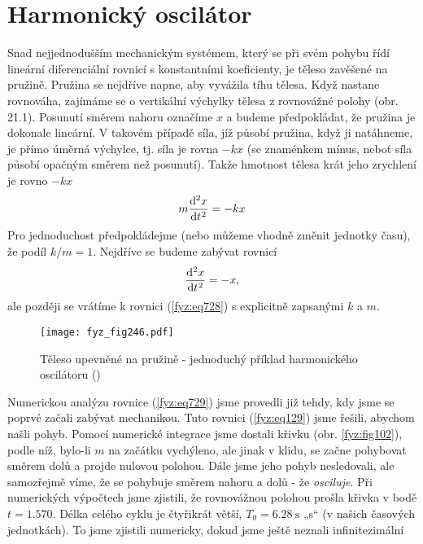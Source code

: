   \section{Harmonický oscilátor}\label{fyz:IchapXXIsecII}
    Snad nejjednodušším mechanickým systémem, který se při svém pohybu řídí lineární diferenciální
    rovnicí s konstantními koeficienty, je těleso zavěšené na pružině. Pružina se nejdříve napne,
    aby vyvážila tíhu tělesa. Když nastane rovnováha, zajímáme se o vertikální výchylky tělesa z
    rovnovážné polohy (obr. 21.1). Posunutí směrem nahoru označíme \(x\) a budeme předpokládat, že
    pružina je dokonale lineární. V takovém případě síla, jíž působí pružina, když ji natáhneme, je
    přímo úměrná výchylce, tj. síla je rovna \(-kx\) (se znaménkem mínus, neboť síla působí opačným
    směrem než posunutí). Takže hmotnost tělesa krát jeho zrychlení je rovno \(-kx\)
    \begin{equation}\label{fyz:eq728}
      m\diff[2]xt = -kx
    \end{equation}
    Pro jednoduchost předpokládejme (nebo můžeme vhodně změnit jednotky času), že podíl
    \(k/m =1\). Nejdříve se budeme zabývat rovnicí
    \begin{equation}\label{fyz:eq729}
      \diff[2]xt = -x,
    \end{equation}
    ale později se vrátíme k rovnici (\ref{fyz:eq728}) s explicitně zapsanými \(k\) a \(m\).
    \begin{figure}[ht!] %
      \centering
      \texttt{[image: fyz\_fig246.pdf]}
      \caption{Těleso upevněné na pružině - jednoduchý příklad harmonického oscilátoru
               (\cite[s.~287]{Feynman01})}
      \label{fyz:fig246}
    \end{figure}
    Numerickou analýzu rovnice (\ref{fyz:eq729}) jsme provedli již tehdy, kdy jsme se poprvé začali
    zabývat mechanikou. Tuto rovnici (\ref{fyz:eq129}) jsme řešili, abychom našli pohyb. Pomocí
    numerické integrace jsme dostali křivku (obr. \ref{fyz:fig102}), podle níž, bylo-li \(m\) na
    začátku vychýleno, ale jinak v klidu, se začne pohybovat směrem dolů a projde nulovou polohou.
    Dále jsme jeho pohyb nesledovali, ale samozřejmě víme, že se pohybuje směrem nahoru a dolů - že
    \emph{osciluje}. Při numerických výpočtech jsme zjistili, že rovnovážnou polohou prošla křivka v
    bodě \(t= \num{1.570}\). Délka celého cyklu je čtyřikrát větší, \(T_0 =\SI{6.28}{\s}\) „s“ (v
    našich časových jednotkách). To jsme zjistili numericky, dokud jsme ještě neznali inﬁnitezimální
